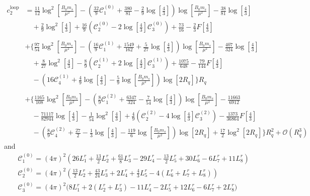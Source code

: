 \documentclass[12pt,a4paper]{article}
\begin{document}
\begin{align}
	c_2^{\text{loop}} &= \frac{11}{12} \log^2 \left[ \frac{B_0 m_s}{\mu^2} \right] - \left( \frac{32}{9} \mathcal{C}_1^{(0)} + \frac{380}{81} - \frac{2}{9} \log \left[ \frac{4}{3} \right] \right) \log \left[ \frac{B_0 m_s}{\mu^2} \right] - \frac{38}{81} \log \left[ \frac{4}{3} \right]
  \nonumber \\	&  \quad
 + \frac{2}{9} \log^2 \left[ \frac{4}{3} \right]
 + \frac{16}{9} \left( \mathcal{C}_2^{(0)} - 2 \log \left[ \frac{4}{3} \right] \mathcal{C}_3^{(0)} \right) + \frac{73}{16} -\frac{2}{3} F \left[ \frac{4}{3} \right] \nonumber \\
	& \nonumber \\
	& + \bigg\{ \frac{97}{54} \log^2 \left[ \frac{B_0 m_s}{\mu ^2} \right] - \left( \frac{16}{9} \mathcal{C}_1^{(1)} + \frac{1549}{162} + \frac{5}{27} \log \left[ \frac{4}{3} \right] \right) \log \left[ \frac{B_0 m_s}{\mu^2} \right] - \frac{407}{324} \log \left[ \frac{4}{3} \right]
 \nonumber \\
	&  \quad
 + \frac{8}{27} \log^2 \left[ \frac{4}{3} \right]
  - \frac{8}{9} \left( \mathcal{C}_2^{(1)} + 2 \log \left[ \frac{4}{3} \right] \mathcal{C}_3^{(1)} \right) + \frac{1075}{648} - \frac{79}{144} F\left[ \frac{4}{3}\right]
\nonumber\\&\quad
 -\left(16 \mathcal{C}_4^{(1)} + \frac{4}{9} \log \left[ \frac{4}{3} \right] - \frac{5}{9}\log\left[ \frac{B_0 m_s}{\mu^2} \right] \right) \log [2R_q] \bigg\} R_q \nonumber \\
	& \nonumber \\
	& + \bigg\{ \frac{1165}{108} \log^2 \left[ \frac{B_0 m_s}{\mu^2} \right] - \left( \frac{8}{9} \mathcal{C}_1^{(2)} + \frac{6347}{324} - \frac{7}{54} \log \left[ \frac{4}{3} \right] \right) \log \left[ \frac{B_0 m_s}{\mu^2} \right] - \frac{11663}{6912} \nonumber \\
	& \quad - \frac{71117}{82944} \log \left[ \frac{4}{3} \right] - \frac{1}{54} \log^2 \left[ \frac{4}{3} \right] + \frac{4}{9} \left( \mathcal{C}_2^{(2)} - 4 \log \left[ \frac{4}{3} \right] \mathcal{C}_3^{(2)} \right) - \frac{1373}{36864} F \left[ \frac{4}{3} \right] \nonumber \\
	& \quad - \left( \frac{8}{9} \mathcal{C}_4^{(2)} + \frac{27}{2} - \frac{1}{3} \log \left[ \frac{4}{3} \right] - \frac{119}{6} \log \left[ \frac{B_0 m_s}{\mu^2} \right] \right) \log [2R_q] + \frac{17}{2} \log^2 [2R_q] \bigg\} R_q^2 + \mathcal{O} (R_q^3)
\end{align}
and
\begin{align}
	& \mathcal{C}_1^{(0)} = (4 \pi)^2 \left( 26 L^r_1 + \frac{13}{2} L^r_2 + \frac{61}{8} L^r_3 - 29 L^r_4 - \frac{13}{2} L^r_5 + 30 L^r_6 - 6 L^r_7 + 11 L^r_8 \right) \nonumber  \\
	& \mathcal{C}_2^{(0)} = (4 \pi)^2 \left( \frac{13}{2} L^r_2 + \frac{43}{24} L^r_3 + 2 L^r_4 + \frac{4}{3} L^r_5 -4 ( L^r_6 + L^r_7 + L^r_8 ) \right) \nonumber \\
	& \mathcal{C}_3^{(0)} = (4 \pi)^2 \bigg( 8 L^r_1 + 2( L^r_2 + L^r_3) - 11 L^r_4 - 2 L^r_5 + 12 L^r_6 - 6 L^r_7 + 2 L^r_8 \bigg)
\end{align}
\end{document}
